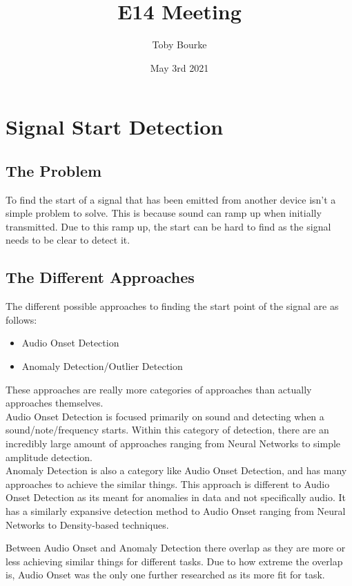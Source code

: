 \documentclass{article}
\title{E14 Meeting}
\author{Toby Bourke}
\date{May 3rd 2021}
\begin{document}
\begin{titlepage}
\maketitle
\end{titlepage}

\section{Signal Start Detection}
\subsection{The Problem}
To find the start of a signal that has been emitted from another device isn't a simple problem to solve. This is because sound can ramp up when initially transmitted. Due to this ramp up, the start can be hard to find as the signal needs to be clear to detect it.

\subsection{The Different Approaches}
The different possible approaches to finding the start point of the signal are as follows:

\begin{itemize}
\item Audio Onset Detection
\item Anomaly Detection/Outlier Detection
\end{itemize}

These approaches are really more categories of approaches than actually approaches themselves.\\

Audio Onset Detection is focused primarily on sound and detecting when a sound/note/frequency starts. Within this category of detection, there are an incredibly large amount of approaches ranging from Neural Networks to simple amplitude detection.\\

Anomaly Detection is also a category like Audio Onset Detection, and has many approaches to achieve the similar things. This approach is different to Audio Onset Detection as its meant for anomalies in data and not specifically audio. It has a similarly expansive detection method to Audio Onset ranging from Neural Networks to Density-based techniques.

Between Audio Onset and Anomaly Detection there overlap as they are more or less achieving similar things for different tasks. Due to how extreme the overlap is, Audio Onset was the only one further researched as its more fit for task.
\end{document}
